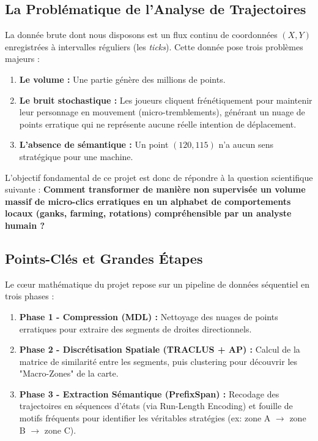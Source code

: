 \documentclass[11pt, a4paper]{article}
\begin{document}
\subsection{La Problématique de l'Analyse de Trajectoires}
La donnée brute dont nous disposons est un flux continu de coordonnées $(X, Y)$ enregistrées à intervalles réguliers (les \textit{ticks}). Cette donnée pose trois problèmes majeurs :
\begin{enumerate}
    \item \textbf{Le volume :} Une partie génère des millions de points.
    \item \textbf{Le bruit stochastique :} Les joueurs cliquent frénétiquement pour maintenir leur personnage en mouvement (micro-tremblements), générant un nuage de points erratique qui ne représente aucune réelle intention de déplacement.
    \item \textbf{L'absence de sémantique :} Un point $(120, 115)$ n'a aucun sens stratégique pour une machine.
\end{enumerate}

L'objectif fondamental de ce projet est donc de répondre à la question scientifique suivante : \textbf{Comment transformer de manière non supervisée un volume massif de micro-clics erratiques en un alphabet de comportements locaux (ganks, farming, rotations) compréhensible par un analyste humain ?}

\subsection{Points-Clés et Grandes Étapes}

Le cœur mathématique du projet repose sur un pipeline de données séquentiel en trois phases :
\begin{enumerate}
    \item \textbf{Phase 1 - Compression (MDL) :} Nettoyage des nuages de points erratiques pour extraire des segments de droites directionnels.
    \item \textbf{Phase 2 - Discrétisation Spatiale (TRACLUS + AP) :} Calcul de la matrice de similarité entre les segments, puis clustering pour découvrir les "Macro-Zones" de la carte.
    \item \textbf{Phase 3 - Extraction Sémantique (PrefixSpan) :} Recodage des trajectoires en séquences d'états (via Run-Length Encoding) et fouille de motifs fréquents pour identifier les véritables stratégies (ex: zone A $\rightarrow$ zone B $\rightarrow$ zone C).
\end{enumerate}
\end{document}
